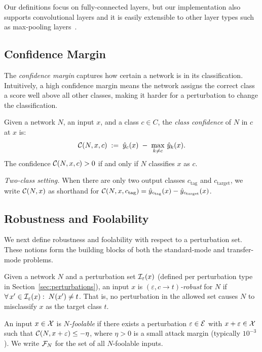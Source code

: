 Our definitions focus on fully-connected layers, but our implementation also supports convolutional layers and it is easily extensible to other layer types such as max-pooling layers~\cite{mipverify}.

\subsection{Confidence Margin}

The \emph{confidence margin} captures how certain a network is in its classification. Intuitively, a high confidence margin means the network assigns the correct class a score well above all other classes, making it harder for a perturbation to change the classification.

\begin{definition}
  \label{def:conf}
  Given a network $N$, an input $x$, and a class $c \in C$, the \emph{class confidence} of $N$ in $c$ at $x$ is:
  \[
    \mathcal{C}(N,x,c) \;:=\; \hat{y}_c(x) \;-\; \max_{k \neq c}\, \hat{y}_k(x).
  \]
  The confidence $\mathcal{C}(N,x,c) > 0$ if and only if $N$ classifies $x$ as $c$.

  \noindent\emph{Two-class setting.}
  When there are only two output classes $c_{\mathrm{tag}}$ and
  $c_{\mathrm{target}}$, we write $\mathcal{C}(N,x)$ as shorthand for
  $\mathcal{C}(N,x,c_{\mathrm{tag}}) = \hat{y}_{c_{\mathrm{tag}}}(x)
  - \hat{y}_{c_{\mathrm{target}}}(x)$.
\end{definition}

\subsection{Robustness and Foolability}

We next define robustness and foolability with respect to a perturbation set. These notions form the building blocks of both the standard-mode and transfer-mode problems.

\begin{definition}
  \label{def:robust}
  Given a network $N$ and a perturbation set $\mathcal{I}_\varepsilon(x)$ (defined per perturbation type in Section~\ref{sec:perturbations}), an input $x$ is \emph{$(\varepsilon, c \to t)$-robust} for $N$ if
  $\forall\, x' \in \mathcal{I}_\varepsilon(x):\; N(x') \neq t$.
  That is, no perturbation in the allowed set causes $N$ to misclassify $x$ as the target class $t$.
\end{definition}

\begin{definition}[$N$-foolability]
  \label{def:foolable}
  An input $x\in\mathcal{X}$ is \emph{$N$-foolable} if there exists a perturbation $\varepsilon\in\mathcal{E}$ with $x+\varepsilon\in\mathcal{X}$ such that $\mathcal{C}(N,x+\varepsilon)\leq -\eta$, where $\eta > 0$ is a small attack margin (typically $10^{-3}$). We write $\mathcal{F}_{N}$ for the set of all $N$-foolable inputs.
\end{definition}

